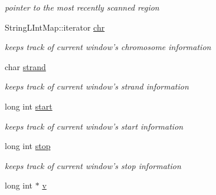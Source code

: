 \begin{CompactItemize}
\begin{CompactList}\small\item\em pointer to the most recently scanned region \item\end{CompactList}\item 
\hypertarget{classGenomicRegionSetScanner_3f0ba2ab42e8029297f63ba5cf2f9b95}{
StringLIntMap::iterator \hyperlink{classGenomicRegionSetScanner_3f0ba2ab42e8029297f63ba5cf2f9b95}{chr}}
\label{classGenomicRegionSetScanner_3f0ba2ab42e8029297f63ba5cf2f9b95}

\begin{CompactList}\small\item\em keeps track of current window's chromosome information \item\end{CompactList}\item 
\hypertarget{classGenomicRegionSetScanner_0b9c57901528e75d9d32f4f98a708f4b}{
char \hyperlink{classGenomicRegionSetScanner_0b9c57901528e75d9d32f4f98a708f4b}{strand}}
\label{classGenomicRegionSetScanner_0b9c57901528e75d9d32f4f98a708f4b}

\begin{CompactList}\small\item\em keeps track of current window's strand information \item\end{CompactList}\item 
\hypertarget{classGenomicRegionSetScanner_305a53be4686bb873996e83b3c393701}{
long int \hyperlink{classGenomicRegionSetScanner_305a53be4686bb873996e83b3c393701}{start}}
\label{classGenomicRegionSetScanner_305a53be4686bb873996e83b3c393701}

\begin{CompactList}\small\item\em keeps track of current window's start information \item\end{CompactList}\item 
\hypertarget{classGenomicRegionSetScanner_f39ff3f8e4f1a1ab55c004cd06c2378a}{
long int \hyperlink{classGenomicRegionSetScanner_f39ff3f8e4f1a1ab55c004cd06c2378a}{stop}}
\label{classGenomicRegionSetScanner_f39ff3f8e4f1a1ab55c004cd06c2378a}

\begin{CompactList}\small\item\em keeps track of current window's stop information \item\end{CompactList}\item 
\hypertarget{classGenomicRegionSetScanner_19e26d0661ce5f380a72f3eb43b0b07f}{
long int $\ast$ \hyperlink{classGenomicRegionSetScanner_19e26d0661ce5f380a72f3eb43b0b07f}{v}}
\label{classGenomicRegionSetScanner_19e26d0661ce5f380a72f3eb43b0b07f}


\end{CompactItemize}

